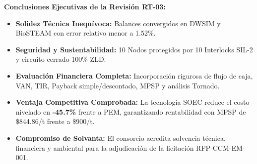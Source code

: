\documentclass[10pt,landscape]{article}
\begin{document}
\begin{minipage}[t]{0.46\textwidth}
  \begin{tcolorbox}[colback=white,colframe=emeraldgreen!60,arc=1.5mm,boxrule=0.7pt,top=3pt,bottom=3pt,left=5pt,right=5pt]
    \textbf{\fontsize{7.5pt}{9.0pt}\selectfont \color{emeraldgreen}Conclusiones Ejecutivas de la Revisión RT-03:}\par\vspace{2pt}
    \fontsize{5.2pt}{6.4pt}\selectfont
    \begin{itemize}[leftmargin=1.2em,itemsep=2.5pt]
      \item \textbf{Solidez Técnica Inequívoca:} Balances convergidos en DWSIM y BioSTEAM con error relativo menor a 1.52\%.
      \item \textbf{Seguridad y Sustentabilidad:} 10 Nodos protegidos por 10 Interlocks SIL-2 y circuito cerrado 100\% ZLD.
      \item \textbf{Evaluación Financiera Completa:} Incorporación rigurosa de flujo de caja, VAN, TIR, Payback simple/descontado, MPSP y análisis Tornado.
      \item \textbf{Ventaja Competitiva Comprobada:} La tecnología SOEC reduce el costo nivelado en \textbf{-45.7\%} frente a PEM, garantizando rentabilidad con MPSP de \$844.86/t frente a \$900/t.
      \item \textbf{Compromiso de Solvanta:} El consorcio acredita solvencia técnica, financiera y ambiental para la adjudicación de la licitación RFP-CCM-EM-001.
    \end{itemize}
  \end{tcolorbox}
\end{minipage}
\end{document}

